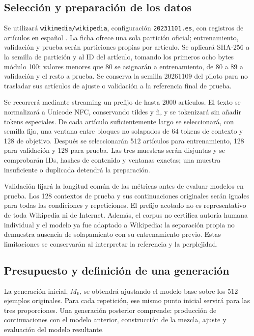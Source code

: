\documentclass[12pt,letterpaper]{article}
\begin{document}
\subsection{Selección y preparación de los datos}

Se utilizará \texttt{wikimedia/wikipedia}, configuración
\texttt{20231101.es}, con registros de artículos en español
\cite{wikipediacard}. La ficha ofrece una sola partición oficial;
entrenamiento, validación y prueba serán particiones propias por artículo.
Se aplicará SHA-256 a la semilla de partición y al ID del artículo, tomando
los primeros ocho bytes módulo 100: valores menores que 80 se asignarán
a entrenamiento, de 80 a 89 a validación y el resto a prueba. Se conserva
la semilla 20261109 del piloto para no trasladar sus artículos de ajuste
o validación a la referencia final de prueba.

Se recorrerá mediante streaming un prefijo de hasta 2000 artículos. El texto
se normalizará a Unicode NFC, conservando tildes y ñ, y se tokenizará sin
añadir tokens especiales. De cada artículo suficientemente largo se
seleccionará, con semilla fija, una ventana entre bloques no solapados de
64 tokens de contexto y 128 de objetivo. Después se seleccionarán 512
artículos para entrenamiento, 128 para validación y 128 para prueba.
Las tres muestras serán disjuntas y se comprobarán IDs, hashes de contenido
y ventanas exactas; una muestra insuficiente o duplicada detendrá la preparación.

Validación fijará la longitud común de las métricas antes de evaluar modelos
en prueba. Los 128 contextos de prueba y sus continuaciones originales serán
iguales para todas las condiciones y repeticiones. El prefijo acotado no es
representativo de toda Wikipedia ni de Internet. Además, el corpus no
certifica autoría humana individual y el modelo ya fue adaptado a Wikipedia:
la separación propia no demuestra ausencia de solapamiento con su entrenamiento
previo. Estas limitaciones se conservarán al interpretar la referencia y la
perplejidad.

\subsection{Presupuesto y definición de una generación}

La generación inicial, \(M_0\), se obtendrá ajustando el modelo base sobre
los 512 ejemplos originales. Para cada repetición, ese mismo punto inicial
servirá para las tres proporciones. Una generación posterior comprende:
producción de continuaciones con el modelo anterior, construcción de la
mezcla, ajuste y evaluación del modelo resultante.
\end{document}
